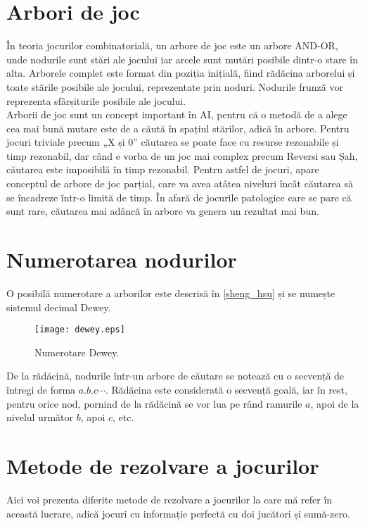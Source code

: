 \documentclass[12pt,twoside,a4paper,fleqn]{book}
\theoremstyle{definition}
\begin{document}
\section{Arbori de joc}
În teoria jocurilor combinatorială, un arbore de joc este un arbore AND-OR, unde nodurile sunt stări ale jocului iar  arcele sunt mutări posibile dintr-o stare în alta. Arborele complet este format din poziția inițială, fiind rădăcina arborelui și toate stările posibile ale jocului, reprezentate prin noduri. Nodurile frunză vor reprezenta sfârșiturile posibile ale jocului.\\
Arborii de joc sunt un concept important în AI, pentru că o metodă de a alege cea mai bună mutare este de a căută în spațiul stărilor, adică în arbore. Pentru jocuri triviale precum „X și 0” căutarea se poate face cu resurse rezonabile și timp rezonabil, dar când e vorba de un joc mai complex precum Reversi sau Șah, căutarea este imposibilă în timp rezonabil. Pentru astfel de jocuri, apare conceptul de arbore de joc parțial, care va avea atâtea niveluri încât căutarea să se încadreze într-o limită de timp. În afară de jocurile patologice \cite{pathological} care se pare că sunt rare, căutarea mai adâncă în arbore va genera un rezultat mai bun.

\section{Numerotarea nodurilor}
O posibilă numerotare a arborilor este descrisă în \ref{sheng_hsu} și se numește sistemul decimal Dewey.

\begin{figure}[h]
\begin{center}
\texttt{[image: dewey.eps]}
\caption{\small{Numerotare Dewey.}}
\label{fig:and_or_tree}
\end{center}
\end{figure}

De la rădăcină, nodurile într-un arbore de căutare se notează cu o secvență de întregi de forma $a.b.c\cdots$. Rădăcina este considerată o secvență goală, iar în rest, pentru orice nod, pornind de la rădăcină se vor lua pe rând ramurile $a$, apoi de la nivelul următor $b$, apoi $c$, etc.


\section{Metode de rezolvare a jocurilor}
Aici voi prezenta diferite metode de rezolvare a jocurilor la care mă refer în această lucrare, adică jocuri cu informație perfectă cu doi jucători și sumă-zero.
\end{document}
